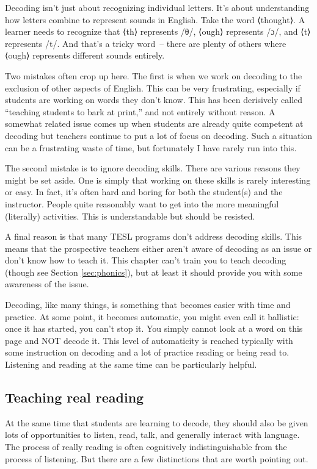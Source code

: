 Decoding isn't just about recognizing individual letters. It's about understanding how letters combine to represent sounds in English. Take the word ⟨thought⟩. A learner needs to recognize that ⟨th⟩ represents /θ/, ⟨ough⟩ represents /ɔ/, and ⟨t⟩ represents /t/. And that's a tricky word~-- there are plenty of others where ⟨ough⟩ represents different sounds entirely.

Two mistakes often crop up here. The first is when we work on decoding to the exclusion of other aspects of English. This can be very frustrating, especially if students are working on words they don't know. This has been derisively called ``teaching students to bark at print,'' and not entirely without reason. A somewhat related issue comes up  when students are already quite competent at decoding but teachers continue to put a lot of focus on decoding. Such a situation can be a frustrating waste of time, but fortunately I have rarely run into this.

The second mistake is to ignore decoding skills. There are various reasons they might be set aside. One is simply that working on these skills is rarely interesting or easy. In fact, it's often hard and boring for both the student(s) and the instructor. People quite reasonably want to get into the more meaningful (literally) activities. This is understandable but should be resisted.

A final reason is that many TESL programs don't address decoding skills. This means that the prospective teachers either aren't aware of decoding as an issue or don't know how to teach it. This chapter can't train you to teach decoding (though see Section \ref{sec:phonics}), but at least it should provide you with some awareness of the issue.

Decoding, like many things, is something that becomes easier with time and practice. At some point, it becomes automatic, you might even call it ballistic: once it has started, you can't stop it. You simply cannot look at a word on this page and NOT decode it. This level of automaticity is reached typically with some instruction on decoding and a lot of practice reading or being read to. Listening and reading at the same time can be particularly helpful.

\subsection{Teaching real reading}

At the same time that students are learning to decode, they should also be given lots of opportunities to listen, read, talk, and generally interact with language. The process of really reading is often cognitively indistinguishable from the process of listening. But there are a few distinctions that are worth pointing out.

